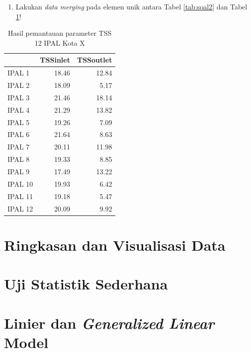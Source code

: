 \documentclass[12pt,]{krantz}
\providecommand{\tightlist}{%
  \setlength{\itemsep}{0pt}\setlength{\parskip}{0pt}}
\begin{document}
\begin{enumerate}
\def\labelenumi{\arabic{enumi}.}
\setcounter{enumi}{2}
\tightlist
\item
  Lakukan \emph{data merging} pada elemen unik antara Tabel \ref{tab:soal2} dan Tabel \ref{tab:soal3}!
\end{enumerate}

\begin{table}

\caption{\label{tab:soal3}Hasil pemantauan parameter TSS 12 IPAL Kota X}
\centering
\begin{tabular}[t]{l|r|r}
\hline
  & TSSinlet & TSSoutlet\\
\hline
IPAL 1 & 18.46 & 12.84\\
\hline
IPAL 2 & 18.09 & 5.17\\
\hline
IPAL 3 & 21.46 & 18.14\\
\hline
IPAL 4 & 21.29 & 13.82\\
\hline
IPAL 5 & 19.26 & 7.09\\
\hline
IPAL 6 & 21.64 & 8.63\\
\hline
IPAL 7 & 20.11 & 11.98\\
\hline
IPAL 8 & 19.33 & 8.85\\
\hline
IPAL 9 & 17.49 & 13.22\\
\hline
IPAL 10 & 19.93 & 6.42\\
\hline
IPAL 11 & 19.18 & 5.47\\
\hline
IPAL 12 & 20.09 & 9.92\\
\hline
\end{tabular}
\end{table}

\hypertarget{ringkasan-dan-visualisasi-data}{%
\chapter{Ringkasan dan Visualisasi Data}\label{ringkasan-dan-visualisasi-data}}

\hypertarget{uji-statistik-sederhana}{%
\chapter{Uji Statistik Sederhana}\label{uji-statistik-sederhana}}

\hypertarget{linier-dan-generalized-linear-model}{%
\chapter{\texorpdfstring{Linier dan \emph{Generalized Linear} Model}{Linier dan Generalized Linear Model}}\label{linier-dan-generalized-linear-model}}
\end{document}
